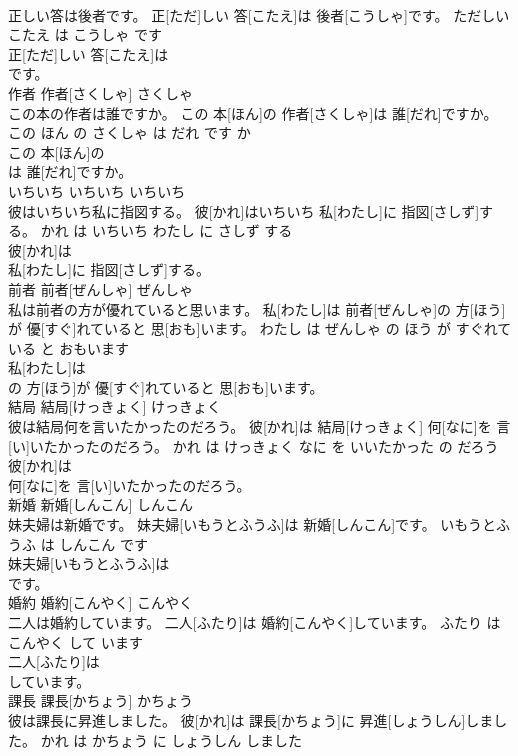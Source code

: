 \documentclass[8pt]{extreport}
\begin{document}
\begin{CJK}{UTF8}{min}
\\	正しい答は後者です。	正[ただ]しい 答[こたえ]は 後者[こうしゃ]です。	ただしい こたえ は こうしゃ です	
\\	正[ただ]しい 答[こたえ]は
\\	です。			
\\	作者	作者[さくしゃ]	さくしゃ	
\\	この本の作者は誰ですか。	この 本[ほん]の 作者[さくしゃ]は 誰[だれ]ですか。	この ほん の さくしゃ は だれ です か	
\\	この 本[ほん]の
\\	は 誰[だれ]ですか。			
\\	いちいち	いちいち	いちいち	
\\	彼はいちいち私に指図する。	彼[かれ]はいちいち 私[わたし]に 指図[さしず]する。	かれ は いちいち わたし に さしず する	
\\	彼[かれ]は
\\	私[わたし]に 指図[さしず]する。			
\\	前者	前者[ぜんしゃ]	ぜんしゃ	
\\	私は前者の方が優れていると思います。	私[わたし]は 前者[ぜんしゃ]の 方[ほう]が 優[すぐ]れていると 思[おも]います。	わたし は ぜんしゃ の ほう が すぐれて いる と おもいます	
\\	私[わたし]は
\\	の 方[ほう]が 優[すぐ]れていると 思[おも]います。			
\\	結局	結局[けっきょく]	けっきょく	
\\	彼は結局何を言いたかったのだろう。	彼[かれ]は 結局[けっきょく] 何[なに]を 言[い]いたかったのだろう。	かれ は けっきょく なに を いいたかった の だろう	
\\	彼[かれ]は
\\	何[なに]を 言[い]いたかったのだろう。			
\\	新婚	新婚[しんこん]	しんこん	
\\	妹夫婦は新婚です。	妹夫婦[いもうとふうふ]は 新婚[しんこん]です。	いもうとふうふ は しんこん です	
\\	妹夫婦[いもうとふうふ]は
\\	です。			
\\	婚約	婚約[こんやく]	こんやく	
\\	二人は婚約しています。	二人[ふたり]は 婚約[こんやく]しています。	ふたり は こんやく して います	
\\	二人[ふたり]は
\\	しています。			
\\	課長	課長[かちょう]	かちょう	
\\	彼は課長に昇進しました。	彼[かれ]は 課長[かちょう]に 昇進[しょうしん]しました。	かれ は かちょう に しょうしん しました	

\end{CJK}
\end{document}
